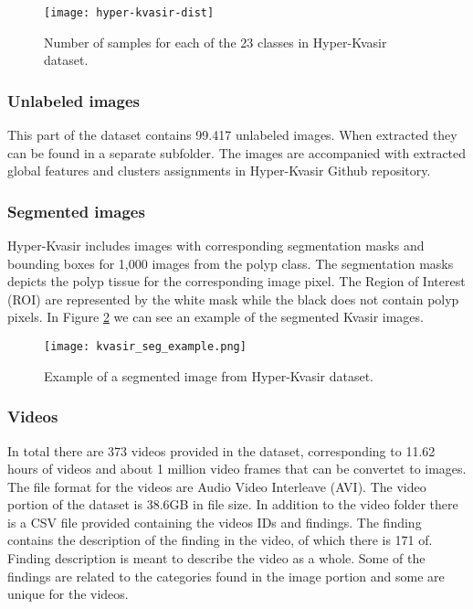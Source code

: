 \documentclass[thesis.tex]{subfiles}
\begin{document}
\begin{figure}[H] %
  \begin{center}
    \texttt{[image: hyper-kvasir-dist]}
    \caption{Number of samples for each of the 23 classes in Hyper-Kvasir dataset.}
    \label{fig:hyper-kvasir-dist}
  \end{center}
\end{figure}

\subsubsection{Unlabeled images}
This part of the dataset contains 99.417 unlabeled images. When extracted they can be found in a separate subfolder. The images are accompanied with extracted global features and clusters assignments in Hyper-Kvasir Github repository. 

\subsubsection{Segmented images}
Hyper-Kvasir includes images with corresponding segmentation masks and bounding boxes for 1,000 images from the polyp class. The segmentation masks depicts the polyp tissue for the corresponding image pixel. The Region of Interest (ROI) are represented by the white mask while the black does not contain polyp pixels. In Figure \ref{fig:kvasir_seg_example} we can see an example of the segmented Kvasir images.

\begin{figure}[H] %
  \begin{center}
    \texttt{[image: kvasir\_seg\_example.png]}
    \caption{Example of a segmented image from Hyper-Kvasir dataset.}
    \label{fig:kvasir_seg_example}
  \end{center}
\end{figure}


\subsubsection{Videos}
In total there are 373 videos provided in the dataset, corresponding to 11.62 hours of videos and about 1 million video frames that can be convertet to images. The file format for the videos are Audio Video Interleave (AVI). The video portion of the dataset is 38.6GB in file size. In addition to the video folder there is a CSV file provided containing the videos IDs and findings. The finding contains the description of the finding in the video, of which there is 171 of. Finding description is meant to describe the video as a whole. Some of the findings are related to the categories found in the image portion and some are unique for the videos.
\end{document}
